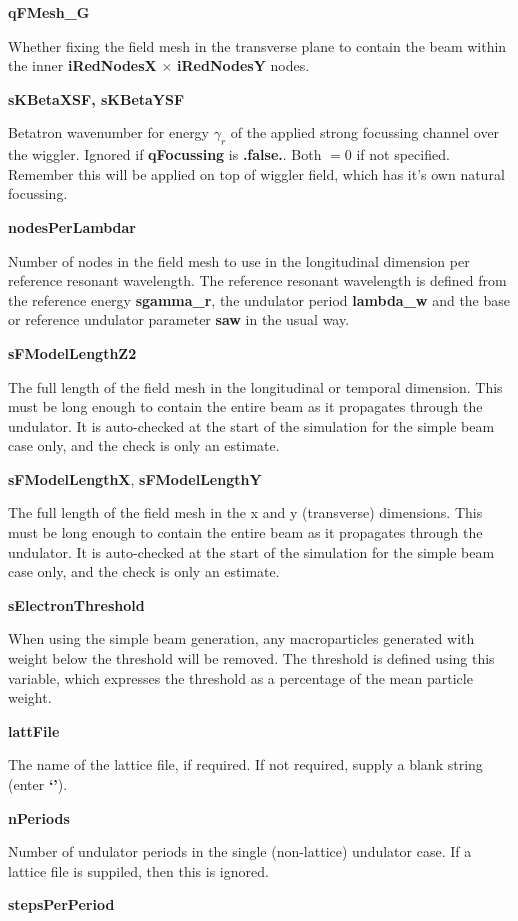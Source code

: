 \documentclass[12pt]{article}%
\begin{document}
{\bf qFMesh\_G}

Whether fixing the field mesh in the transverse plane to contain the beam within the inner {\bf iRedNodesX} $\times$ {\bf iRedNodesY} nodes.


{\bf sKBetaXSF, sKBetaYSF}

Betatron wavenumber for energy $\gamma_r$ of the applied strong focussing channel over the wiggler. Ignored if {\bf qFocussing} is {\bf .false.}. Both $=0$ if not specified. Remember this will be applied on top of wiggler field, which has it's own natural focussing.

{\bf nodesPerLambdar}

Number of nodes in the field mesh to use in the longitudinal dimension per reference resonant wavelength. The reference resonant wavelength is defined from the reference energy {\bf sgamma\_r}, the undulator period {\bf lambda\_w} and the base or reference undulator parameter {\bf saw} in the usual way.

{\bf sFModelLengthZ2}

The full length of the field mesh in the longitudinal or temporal dimension. This must be long enough to contain the entire beam as it propagates through the undulator. It is auto-checked at the start of the simulation for the simple beam case only, and the check is only an estimate.

{\bf sFModelLengthX}, {\bf sFModelLengthY}

The full length of the field mesh in the x and y (transverse) dimensions. This must be long enough to contain the entire beam as it propagates through the undulator. It is auto-checked at the start of the simulation for the simple beam case only, and the check is only an estimate.

{\bf sElectronThreshold}

When using the simple beam generation, any macroparticles generated with weight below the threshold will be removed. The threshold is defined using this variable, which expresses the threshold as a percentage of the mean particle weight.

{\bf lattFile}

The name of the lattice file, if required. If not required, supply a blank string (enter {\bf `'}).

{\bf nPeriods}

Number of undulator periods in the single (non-lattice) undulator case. If a lattice file is suppiled, then this is ignored.

{\bf stepsPerPeriod}
\end{document}
